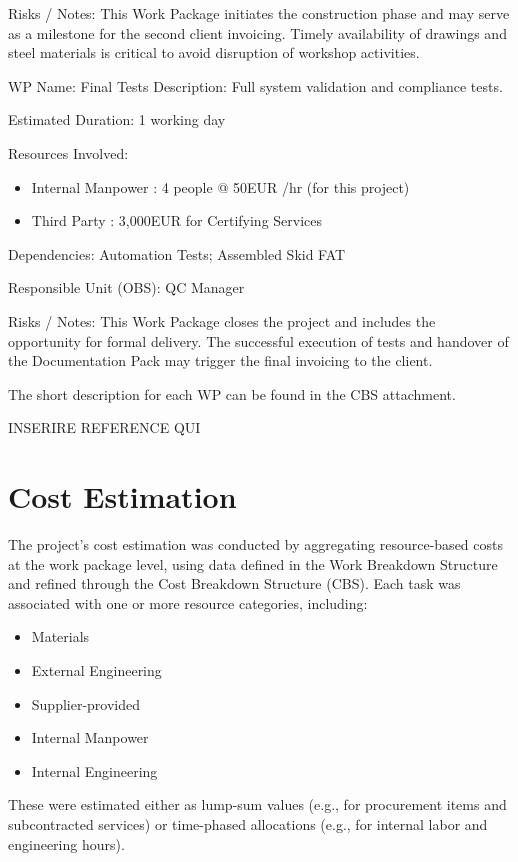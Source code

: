 Risks / Notes:
This Work Package initiates the construction phase and may serve as a milestone for the second client invoicing. Timely availability of drawings and steel materials is critical to avoid disruption of workshop activities.

WP Name: Final Tests
Description:
Full system validation and compliance tests.

Estimated Duration: 1 working day

Resources Involved:
\begin{itemize}
    \item  Internal Manpower : 4 people @ 50EUR /hr (for this project)
    \item  Third Party : 3,000EUR  for Certifying Services

\end{itemize}

Dependencies:
Automation Tests; Assembled Skid FAT

Responsible Unit (OBS): QC Manager

Risks / Notes:
This Work Package closes the project and includes the opportunity for formal delivery. The successful execution of tests and handover of the Documentation Pack may trigger the final invoicing to the client.

The short description for each WP can be found in the CBS attachment.

INSERIRE REFERENCE QUI

\section{Cost Estimation}

The project’s cost estimation was conducted by aggregating resource-based costs at the work package level, using data defined in the Work Breakdown Structure and refined through the Cost Breakdown Structure (CBS). Each task was associated with one or more resource categories, including:
\begin{itemize}
    \item Materials
    \item External Engineering
    \item Supplier-provided
    \item Internal Manpower
    \item Internal Engineering
\end{itemize}


These were estimated either as lump-sum values (e.g., for procurement items and subcontracted services) or time-phased allocations (e.g., for internal labor and engineering hours).

